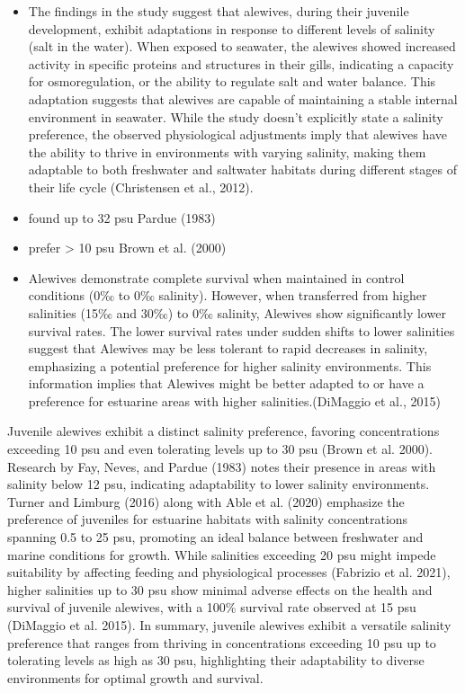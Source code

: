 \documentclass[
]{book}
\begin{document}
\begin{itemize}
\item
  The findings in the study suggest that alewives, during their juvenile development, exhibit adaptations in response to different levels of salinity (salt in the water). When exposed to seawater, the alewives showed increased activity in specific proteins and structures in their gills, indicating a capacity for osmoregulation, or the ability to regulate salt and water balance. This adaptation suggests that alewives are capable of maintaining a stable internal environment in seawater. While the study doesn't explicitly state a salinity preference, the observed physiological adjustments imply that alewives have the ability to thrive in environments with varying salinity, making them adaptable to both freshwater and saltwater habitats during different stages of their life cycle (Christensen et al., 2012).
\item
  found up to 32 psu Pardue (1983)
\item
  prefer \textgreater{} 10 psu Brown et al. (2000)
\item
  Alewives demonstrate complete survival when maintained in control conditions (0‰ to 0‰ salinity).
  However, when transferred from higher salinities (15‰ and 30‰) to 0‰ salinity, Alewives show significantly lower survival rates.
  The lower survival rates under sudden shifts to lower salinities suggest that Alewives may be less tolerant to rapid decreases in salinity, emphasizing a potential preference for higher salinity environments.
  This information implies that Alewives might be better adapted to or have a preference for estuarine areas with higher salinities.(DiMaggio et al., 2015)
\end{itemize}

Juvenile alewives exhibit a distinct salinity preference, favoring concentrations exceeding 10 psu and even tolerating levels up to 30 psu (Brown et al. 2000).
Research by Fay, Neves, and Pardue (1983) notes their presence in areas with salinity below 12 psu, indicating adaptability to lower salinity environments.
Turner and Limburg (2016) along with Able et al. (2020) emphasize the preference of juveniles for estuarine habitats with salinity concentrations spanning 0.5 to 25 psu, promoting an ideal balance between freshwater and marine conditions for growth.
While salinities exceeding 20 psu might impede suitability by affecting feeding and physiological processes (Fabrizio et al. 2021), higher salinities up to 30 psu show minimal adverse effects on the health and survival of juvenile alewives, with a 100\% survival rate observed at 15 psu (DiMaggio et al. 2015).
In summary, juvenile alewives exhibit a versatile salinity preference that ranges from thriving in concentrations exceeding 10 psu up to tolerating levels as high as 30 psu, highlighting their adaptability to diverse environments for optimal growth and survival.
\end{document}
